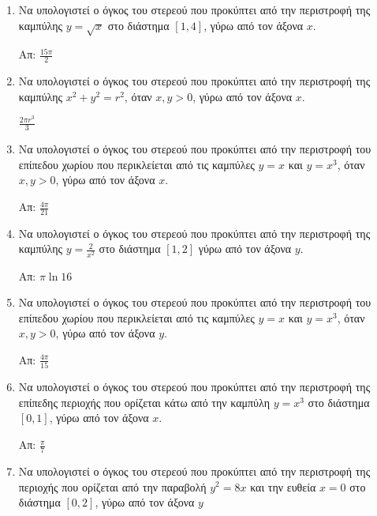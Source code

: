 


\everymath{\displaystyle}



\begin{center}
\end{center}

\vspace{\baselineskip}

\begin{enumerate}
  \item Να υπολογιστεί ο όγκος του στερεού που προκύπτει από την περιστροφή της καμπύλης $y=\sqrt{x}$ στο διάστημα $[1,4]$, γύρω από τον άξονα $x$.

  \hfill Απ: $\frac{15\pi}{2}$

  \item Να υπολογιστεί ο όγκος του στερεού που προκύπτει από την περιστροφή της καμπύλης $x^{2}+y^{2}=r^{2}$, όταν $x,y>0$, γύρω από τον άξονα $x$.

  \hfill $\frac{2\pi r^{3}}{3}$

  \item  Να υπολογιστεί ο όγκος του στερεού που προκύπτει από την περιστροφή του επίπεδου χωρίου που περικλείεται από τις καμπύλες $y=x$ και $y=x^{3}$, όταν $x,y>0$, γύρω από τον άξονα $x$.

  \hfill Απ: $\frac{4\pi}{21}$


  \item  Να υπολογιστεί ο όγκος του στερεού που προκύπτει από την περιστροφή της καμπύλης $y=\frac{2}{x^{2}}$ στο διάστημα $[1,2]$ γύρω από τον άξονα $y$.

  \hfill Απ: $\pi\ln 16$

  \item  Να υπολογιστεί ο όγκος του στερεού που προκύπτει από την περιστροφή του επίπεδου χωρίου που περικλείεται από τις καμπύλες $y=x$ και $y=x^{3}$, όταν $x,y>0$, γύρω από τον άξονα $y$.

  \hfill Απ: $\frac{4\pi}{15}$

   \item Να υπολογιστεί ο όγκος του στερεού που προκύπτει από την περιστροφή της επίπεδης περιοχής που ορίζεται κάτω από την καμπύλη $y=x^{3}$ στο διάστημα $[0,1]$, γύρω από τον άξονα $x$.

   \hfill Απ: $\frac{\pi}{7}$

   \item  Να υπολογιστεί ο όγκος του στερεού που προκύπτει από την περιστροφή της περιοχής που ορίζεται από την παραβολή $y^{2}=8x$ και την ευθεία $x=0$ στο διάστημα $[0,2]$, γύρω από τον άξονα $y$


\end{enumerate}
